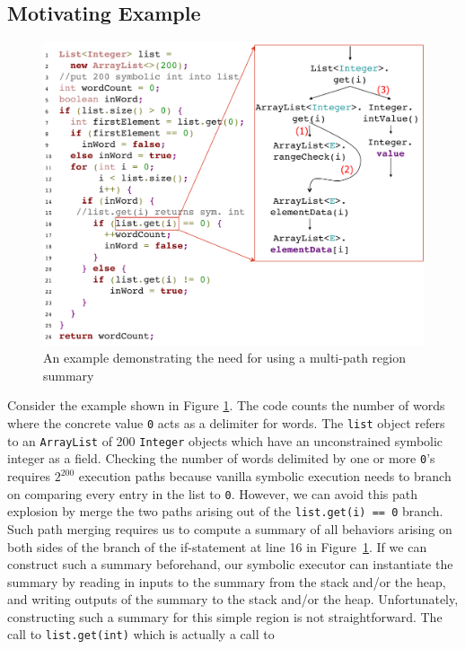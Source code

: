 \subsection{Motivating Example}
\begin{figure}
    \includegraphics[width=\columnwidth]{figures/wordCount.pdf}
    \caption{An example demonstrating the need for using a multi-path region summary}
    \label{fig:mot-example}
\end{figure}
Consider the example shown in Figure \ref{fig:mot-example}.
%
The code counts the number of words where the concrete value {\tt 0} acts as a delimiter for words.
%
The {\tt list} object refers to an {\tt ArrayList} of 200 {\tt Integer} objects which have an unconstrained symbolic
integer as a field.
%
Checking the number of words delimited by one or more {\tt 0}\rq s requires $2^{200}$ execution paths because vanilla
symbolic execution needs to branch on comparing every entry in the list to {\tt 0}.
%
However, we can avoid this path explosion by merge the two paths arising out of the {\tt list.get(i) == 0} branch.
%
Such path merging requires us to compute a summary of all behaviors arising on both sides of the branch of the
if-statement at line 16 in Figure~\ref{fig:mot-example}.
%
If we can construct such a summary beforehand, our symbolic executor can instantiate the summary by reading in inputs to
the summary from the stack and/or the heap, and writing outputs of the summary to the stack and/or the heap.
%
Unfortunately, constructing such a summary for this simple region is not straightforward.
%
The call to {\tt list.get(int)} which is actually a call to

